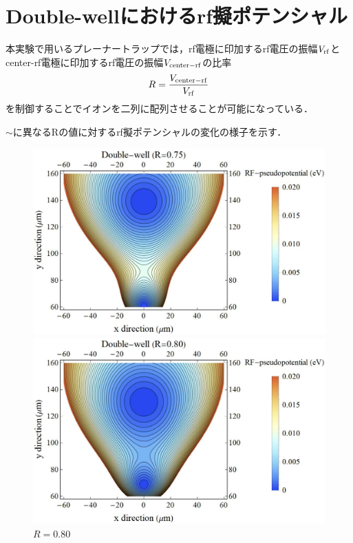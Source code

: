 \clearpage

\section{Double-wellにおけるrf擬ポテンシャル}
本実験で用いるプレーナートラップでは，rf電極に印加するrf電圧の振幅$V_{\rm rf}$とcenter-rf電極に印加するrf電圧の振幅$V_{\rm center-rf}$の比率
\large
\begin{align}
R = \frac{V_{\rm center-rf}}{V_{\rm rf}}
\end{align}
\normalsize
を制御することでイオンを二列に配列させることが可能になっている．

$\sim$に異なるRの値に対するrf擬ポテンシャルの変化の様子を示す．
\begin{figure}[h]
	\begin{minipage}{0.48\linewidth}
		\begin{center}
			\includegraphics[width = 0.9\columnwidth]{./simulation/figure/rf_pseudopotential_R=075.jpg}
			\caption{$R=0.75$}
			\label{fig:R075}
		\end{center}
	\end{minipage}
	\begin{minipage}{0.48\linewidth}
			\begin{center}
				\includegraphics[width = 0.9\columnwidth]{./simulation/figure/rf_pseudopotential_R=080.jpg}
				\caption{$R=0.80$}
				\label{fig:R080}
			\end{center}
		\end{minipage}
\end{figure}

